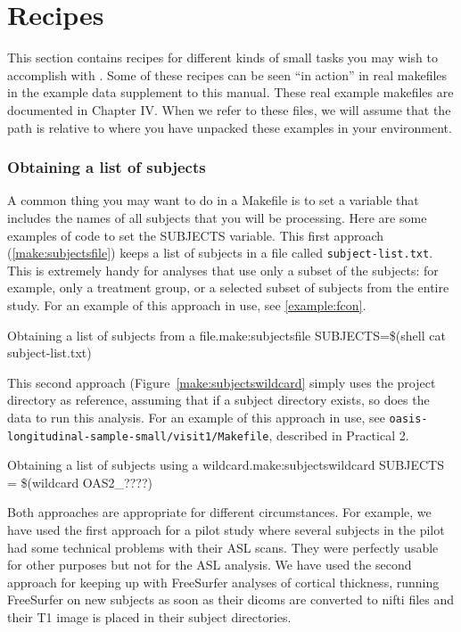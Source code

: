 \chapter{Recipes}
\label{seq:recipes}

This section contains recipes for different kinds of small tasks you may wish to accomplish with \maken{}. Some of these recipes can be seen ``in action'' in real makefiles in the example data supplement to this manual. These real example makefiles are documented in Chapter IV. When we refer to these files, we will assume that the path is relative to where you have unpacked these examples in your environment. 

\subsection{Obtaining a list of subjects}

A common thing you may want to do in a Makefile is to set a variable that includes the names of all subjects that you will be processing. Here are some examples of code to set the SUBJECTS variable. This first approach (\autoref{make:subjectsfile}) keeps a list of subjects in a file called \texttt{subject-list.txt}. 
This is extremely handy for analyses that use only a subset of the subjects: for example, only a treatment group, or a selected subset of subjects from the entire study. For an example of this approach in use, see \autoref{example:fcon}. 

\begin{make}{Obtaining a list of subjects from a file.}{make:subjectsfile}
  SUBJECTS=\$(shell cat subject-list.txt) 
\end{make}


This second approach (Figure~\ref{make:subjectswildcard} simply uses the project directory as reference, assuming that if a subject directory exists, so does the data to run this analysis. For an example of this approach in use, see \texttt{oasis-longitudinal-sample-small/visit1/Makefile}, described in Practical 2. 

\begin{make}{Obtaining a list of subjects using a wildcard.}{make:subjectswildcard}
SUBJECTS = \$(wildcard OAS2\_????)
\end{make}

Both approaches are appropriate for different circumstances. For example, we have used the first approach for a pilot study where several subjects in the pilot had some technical problems with their ASL scans. They were perfectly usable for other purposes but not for the ASL analysis. We have used the second approach for keeping up with FreeSurfer analyses of cortical thickness, running FreeSurfer on new subjects as soon as their dicoms are converted to nifti files and their T1 image is placed in their subject directories.  

